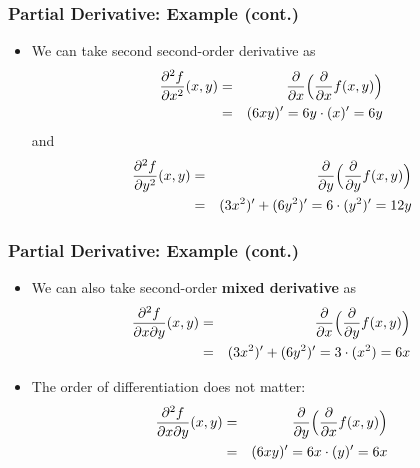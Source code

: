 \documentclass[pdflatex, 12pt]{beamer}
\begin{document}
\begin{frame}
\frametitle{Partial Derivative: Example (cont.)}
\begin{itemize}
\item We can take second second-order derivative as
 \begin{eqnarray}
 \frac{\partial^2 f}{\partial x^2}(x, y) &=& \frac{\partial}{\partial x} \Big(\frac{\partial}{\partial x} f(x, y)\Big) \notag \\
 &=& (6xy)' = 6y \cdot (x)' = 6y \notag 
 \end{eqnarray}
 and
 \begin{eqnarray}
 \frac{\partial^2 f}{\partial y^2}(x, y) &=& \frac{\partial}{\partial y} \Big(\frac{\partial}{\partial y} f(x, y)\Big) \notag \\
 &=& (3x^2)' + (6y^2)' = 6 \cdot (y^2)' = 12y \notag 
 \end{eqnarray}
\end{itemize}
\end{frame}

\begin{frame}
\frametitle{Partial Derivative: Example (cont.)}
\begin{itemize}
\item We can also take second-order \textbf{mixed derivative} as
 \begin{eqnarray}
 \frac{\partial^2 f}{\partial x \partial y}(x, y) &=& \frac{\partial}{\partial x} \Big(\frac{\partial}{\partial y} f(x, y)\Big) \notag \\
 &=& (3x^2)' + (6y^2)' = 3 \cdot (x^2) = 6x \notag 
 \end{eqnarray}
\vspace{0.2cm}
\item The order of differentiation does not matter:
 \begin{eqnarray}
 \frac{\partial^2 f}{\partial x \partial y}(x, y) &=& \frac{\partial}{\partial y} \Big(\frac{\partial}{\partial x} f(x, y)\Big) \notag \\
 &=& (6xy)' = 6x \cdot (y)' = 6x \notag 
 \end{eqnarray}
\end{itemize}
\end{frame}
\end{document}
